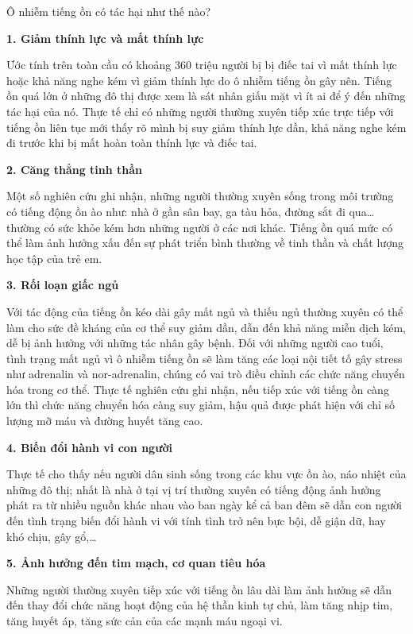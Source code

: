 \begin{enumerate}[label=\bfseries Câu \arabic*:]
	
	{
		Ô nhiễm tiếng ồn có tác hại như thế nào?
	}
	
	\hideall
	{
		\textbf{1. Giảm thính lực và mất thính lực}
		
		Ước tính trên toàn cầu có khoảng 360 triệu người bị bị điếc tai vì mất thính lực hoặc khả năng nghe kém vì giảm thính lực do ô nhiễm tiếng ồn gây nên. Tiếng ồn quá lớn ở những đô thị được xem là sát nhân giấu mặt vì ít ai để ý đến những tác hại của nó. Thực tế chỉ có những người thường xuyên tiếp xúc trực tiếp với tiếng ồn liên tục mới thấy rõ mình bị suy giảm thính lực dần, khả năng nghe kém đi trước khi bị mất hoàn toàn thính lực và điếc tai.
		
		\textbf{2. Căng thẳng tinh thần}
		
		Một số nghiên cứu ghi nhận, những người thường xuyên sống trong môi trường có tiếng động ồn ào như: nhà ở gần sân bay, ga tàu hỏa, đường sắt đi qua… thường có sức khỏe kém hơn những người ở các nơi khác. Tiếng ồn quá mức có thể làm ảnh hưởng xấu đến sự phát triển bình thường về tinh thần và chất lượng học tập của trẻ em.
		
		\textbf{3. Rối loạn giấc ngủ}
		
		Với tác động của tiếng ồn kéo dài gây mất ngủ và thiếu ngủ thường xuyên có thể làm cho sức đề kháng của cơ thể suy giảm dần, dẫn đến khả năng miễn dịch kém, dễ bị ảnh hưởng với những tác nhân gây bệnh. Đối với những người cao tuổi, tình trạng mất ngủ vì ô nhiễm tiếng ồn sẽ làm tăng các loại nội tiết tố gây stress như adrenalin và nor-adrenalin, chúng có vai trò điều chỉnh các chức năng chuyển hóa trong cơ thể. Thực tế nghiên cứu ghi nhận, nếu tiếp xúc với tiếng ồn càng lớn thì chức năng chuyển hóa càng suy giảm, hậu quả được phát hiện với chỉ số lượng mỡ máu và đường huyết tăng cao.
		
		\textbf{4. Biến đổi hành vi con người}
		
		Thực tế cho thấy nếu người dân sinh sống trong các khu vực ồn ào, náo nhiệt của những đô thị; nhất là nhà ở tại vị trí thường xuyên có tiếng động ảnh hưởng phát ra từ nhiều nguồn khác nhau vào ban ngày kể cả ban đêm sẽ dẫn con người đến tình trạng biến đổi hành vi với tính tình trở nên bực bội, dễ giận dữ, hay khó chịu, gây gổ,…
		
		\textbf{5. Ảnh hưởng đến tim mạch, cơ quan tiêu hóa}
		
		Những người thường xuyên tiếp xúc với tiếng ồn lâu dài làm ảnh hưởng sẽ dẫn đến thay đổi chức năng hoạt động của hệ thần kinh tự chủ, làm tăng nhịp tim, tăng huyết áp, tăng sức cản của các mạnh máu ngoại vi.
		
}
\end{enumerate}
